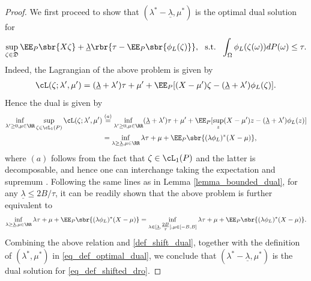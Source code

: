 \documentclass[9pt]{article} %
\numberwithin{equation}{section}
\renewcommand{\frac}[2]{\tfrac{#1}{#2}}
\begin{document}
\begin{proof}
We first proceed to show that $(\lambda^* - \underline{\lambda}, \mu^*)$ is the optimal dual solution for 
\begin{align}\label{eq_def_shifted_dro}
\sup_{\zeta \in \mathfrak{D}} \EE_P \sbr{X \zeta} + \underline{\lambda} \rbr{ \tau - \EE_P \sbr{\phi_L(\zeta)}}, ~~ \mathrm{s.t.} ~~ \int_\Omega \phi_L(\zeta(\omega)) dP(\omega) \leq \tau. 
\end{align}
Indeed, the Lagrangian of the above problem is given by 
\begin{align*}
\cL(\zeta; \lambda', \mu') =  (\underline{\lambda} + \lambda') \tau + \mu' + \EE_P [ (X - \mu')\zeta - (\underline{\lambda} + \lambda')\phi_L(\zeta) ] .
\end{align*}  
Hence the dual is  given by 
\begin{align}
\inf_{\lambda' \geq 0, \mu \in \RR} \sup_{\zeta \in  \cL_1(P)} \cL(\zeta; \lambda', \mu')  & \overset{(a)}{=} 
\inf_{\lambda' \geq 0, \mu \in \RR} (\underline{\lambda} + \lambda') \tau + \mu' + \EE_P [ \sup_z (X-\mu') z - (\underline{\lambda} + \lambda')\phi_L(z) ]  \nonumber \\
& = \inf_{\lambda \geq \underline{\lambda}, \mu \in \RR} \lambda \tau + \mu + \EE_P \sbr{ (\lambda \phi_L)^* (X - \mu) }, \label{def_shift_dual} 
\end{align}
where $(a)$ follows from the fact that  $\zeta \in \cL_1(P)$ and the latter is decomposable, and hence one can interchange taking the expectation and  supremum \cite{rockafellar1998variational}.
Following the same lines as in Lemma \ref{lemma_bounded_dual}, 
for any $\underline{\lambda} \leq 2B/\tau$, 
it can be readily shown that the above problem is further equivalent to 
\begin{align*}
 \inf_{\lambda \geq \underline{\lambda}, \mu \in \RR} \lambda \tau + \mu + \EE_P \sbr{ (\lambda \phi_L)^* (X - \mu) }
 = \inf_{\lambda \in [\underline{\lambda}, \frac{2B}{\tau}], \mu \in [-B, B]} \lambda \tau + \mu + \EE_P \sbr{ (\lambda\phi_L)^* (X - \mu) }.
\end{align*}
Combining the above relation and \eqref{def_shift_dual},
together with the definition of $(\lambda^*, \mu^*)$ in \eqref{eq_def_optimal_dual},
 we conclude that $(\lambda^*- \underline{\lambda}, \mu^*)$ is the dual solution for \eqref{eq_def_shifted_dro}. 
 

\end{proof}
\end{document}
